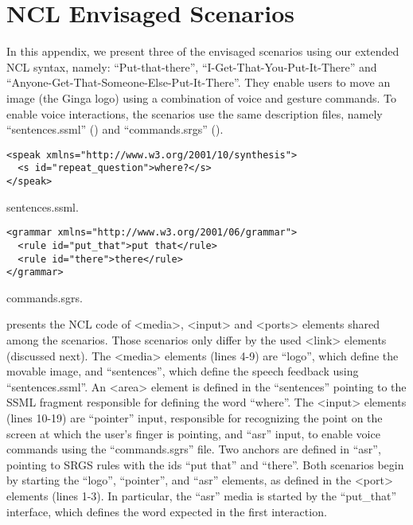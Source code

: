 \chapter{NCL Envisaged Scenarios}
\label{annex:scenarios}

In this appendix, we present three of the envisaged scenarios using our extended
NCL syntax, namely: “Put-that-there”, “I-Get-That-You-Put-It-There” and
“Anyone-Get-That-Someone-Else-Put-It-There”. They enable users to move an image
(the Ginga logo) using a combination of voice and gesture commands. To enable
voice interactions, the scenarios use the same description files, namely
“sentences.ssml” () and “commands.srgs”
().

\begin{listing}[h]
\begin{verbatim}
<speak xmlns="http://www.w3.org/2001/10/synthesis">
  <s id="repeat_question">where?</s>
</speak>
\end{verbatim}
\caption{sentences.ssml.}
\label{list:annexb1}
\end{listing}

\begin{listing}[h]
\begin{verbatim}
<grammar xmlns="http://www.w3.org/2001/06/grammar">
  <rule id="put_that">put that</rule>
  <rule id="there">there</rule>
</grammar>
\end{verbatim}
\caption{commands.sgrs.}
\label{list:annexb2}
\end{listing}

 presents the NCL code of <media>, <input> and <ports>
elements shared among the scenarios. Those scenarios only differ by the used
<link> elements (discussed next). The <media> elements (lines 4-9) are “logo”,
which define the movable image, and “sentences”, which define the speech
feedback using “sentences.ssml”. An <area> element is defined in the “sentences”
pointing to the SSML fragment responsible for defining the word “where”. The
<input> elements (lines 10-19) are “pointer” input, responsible for recognizing
the point on the screen at which the user’s finger is pointing, and “asr” input,
to enable voice commands using the “commands.sgrs” file. Two anchors are defined
in “asr”, pointing to SRGS rules with the ids “put that” and “there”. Both
scenarios begin by starting the “logo”, “pointer”, and “asr” elements, as
defined in the <port> elements (lines 1-3). In particular, the “asr” media is
started by the “put\_that” interface, which defines the word expected in the
first interaction.

